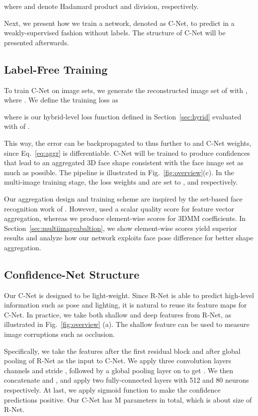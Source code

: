 \documentclass[10pt,twocolumn,letterpaper]{article}
\begin{document}
where  and  denote Hadamard product and division, respectively.

Next, we present how we train a network, denoted as C-Net, to predict  in a weakly-supervised fashion without labels. The structure of C-Net will be presented afterwards.

\subsection{Label-Free Training}\label{section:C-Net}
To train C-Net on image sets, we generate the reconstructed image set  of  with , where . We define the training loss as
\vspace{-6pt}

where  is our hybrid-level loss function defined in Section~\ref{sec:hyrid} evaluated with  of .

This way, the error can be backpropagated to  thus further to  and C-Net weights, since Eq.~\ref{eq:aggr} is differentiable. C-Net will be trained to produce confidences that lead to an aggregated 3D face shape consistent with the face image set as much as possible. The pipeline is illustrated in Fig.~\ref{fig:overview}(c). In the multi-image training stage, the loss weights  and  are set to , and  respectively.

Our aggregation design and training scheme are inspired by the set-based face recognition work of \cite{yang2017neural}. However, \cite{yang2017neural} used a scalar quality score for feature vector aggregation, whereas we produce element-wise scores for 3DMM coefficients. In Section~\ref{sec:multiimageabaltion}, we show element-wise scores yield superior results and analyze how our network exploits face pose difference for better shape aggregation.

\subsection{Confidence-Net Structure}
Our C-Net is designed to be light-weight. Since R-Net is able to predict high-level information such as pose and lighting, it is natural to reuse its feature maps for C-Net. In practice, we take both shallow and deep features from R-Net, as illustrated in Fig.~\ref{fig:overview} (a). The shallow feature can be used to measure image corruptions such as occlusion.

Specifically, we take the features after the first residual block  and after global pooling  of R-Net as the input to C-Net. We apply three  convolution layers  channels and stride , followed by a global pooling layer on  to get . We then concatenate  and , and apply two fully-connected layers with 512 and 80 neurons respectively. At last, we apply sigmoid function to make the confidence predictions  positive. Our C-Net has M parameters in total, which is about  size of R-Net.
\end{document}
